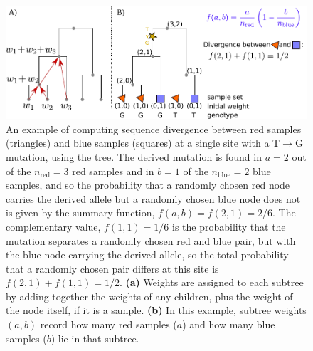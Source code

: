 \documentclass{article}
\begin{document}
\begin{figure}
    \begin{center}
    \includegraphics{figures/divergence_diagram_simple}
    \end{center}
    \caption{
        An example of computing sequence divergence
        between red samples (triangles) and blue samples (squares)
        at a single site with a T$\to$G mutation, using the tree.
        The derived mutation is found in $a=2$ out of the $n_\text{red} = 3$ red samples
        and in $b=1$ of the $n_\text{blue}=2$ blue samples, and so the probability that a randomly chosen red node carries the derived allele
        but a randomly chosen blue node does not
        is given by the summary function, $f(a,b) = f(2, 1) = 2/6$.
        The complementary value, $f(1, 1) = 1/6$ is the probability that the mutation separates
        a randomly chosen red and blue pair, but with the blue node carrying the derived allele,
        so the total probability that a randomly chosen pair
        differs at this site is $f(2,1) + f(1,1) = 1/2$.
        \textbf{(a)} Weights are assigned to each subtree by adding together the weights of any children,
        plus the weight of the node itself, if it is a sample.
        \textbf{(b)} In this example, subtree weights $(a,b)$ record how many red samples ($a$)
        and how many blue samples ($b$) lie in that subtree.
        \label{fig:divergence_diagram}
    }
\end{figure}
\end{document}

